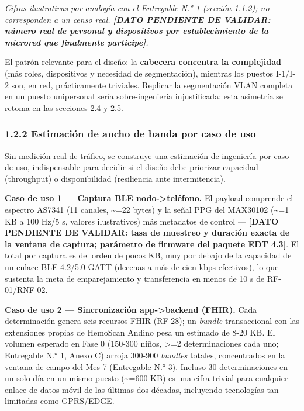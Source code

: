 \documentclass[11pt,a4paper]{article}
\begin{document}
\emph{Cifras ilustrativas por analogía con el Entregable N.° 1 (sección 1.1.2); no corresponden a un censo real. \textbf{{[}DATO PENDIENTE DE VALIDAR: número real de personal y dispositivos por establecimiento de la microred que finalmente participe{]}}.}

El patrón relevante para el diseño: la \textbf{cabecera concentra la complejidad} (más roles, dispositivos y necesidad de segmentación), mientras los puestos I-1/I-2 son, en red, prácticamente triviales. Replicar la segmentación VLAN completa en un puesto unipersonal sería sobre-ingeniería injustificada; esta asimetría se retoma en las secciones 2.4 y 2.5.

\subsubsection{1.2.2 Estimación de ancho de banda por caso de uso}\label{estimaciuxf3n-de-ancho-de-banda-por-caso-de-uso}

Sin medición real de tráfico, se construye una estimación de ingeniería por caso de uso, indispensable para decidir si el diseño debe priorizar capacidad (throughput) o disponibilidad (resiliencia ante intermitencia).

\textbf{Caso de uso 1 --- Captura BLE nodo-\textgreater teléfono.} El payload comprende el espectro AS7341 (11 canales, \textasciitilde=22 bytes) y la señal PPG del MAX30102 (\textasciitilde=1 KB a 100 Hz/5 s, valores ilustrativos) más metadatos de control --- \textbf{{[}DATO PENDIENTE DE VALIDAR: tasa de muestreo y duración exacta de la ventana de captura; parámetro de firmware del paquete EDT 4.3{]}}. El total por captura es del orden de pocos KB, muy por debajo de la capacidad de un enlace BLE 4.2/5.0 GATT (decenas a más de cien kbps efectivos), lo que sustenta la meta de emparejamiento y transferencia en menos de 10 s de RF-01/RNF-02.

\textbf{Caso de uso 2 --- Sincronización app-\textgreater backend (FHIR).} Cada determinación genera seis recursos FHIR (RF-28); un \emph{bundle} transaccional con las extensiones propias de HemoScan Andino pesa un estimado de 8-20 KB. El volumen esperado en Fase 0 (150-300 niños, \textgreater=2 determinaciones cada uno; Entregable N.° 1, Anexo C) arroja 300-900 \emph{bundles} totales, concentrados en la ventana de campo del Mes 7 (Entregable N.° 3). Incluso 30 determinaciones en un solo día en un mismo puesto (\textasciitilde=600 KB) es una cifra trivial para cualquier enlace de datos móvil de las últimas dos décadas, incluyendo tecnologías tan limitadas como GPRS/EDGE.
\end{document}
